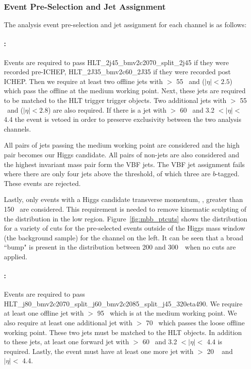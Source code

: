 \subsubsection{Event Pre-Selection and Jet Assignment}
\label{sec:vbf-presel}
The analysis event pre-selection and jet assignment for each channel is as follows:

\paragraph{\fourcentral:} Events are required to pass  HLT\_2j45\_bmv2c2070\_split\_2j45 if they were recorded pre-ICHEP, HLT\_2J35\_bmv2c60\_2J35 if they were recorded post ICHEP.  Then we require at least two offline jets with \pT $>$ 55 \GeV~and ($|\eta| < 2.5$) which pass the offline \btagging at the medium working point.  Next, these jets are required to be matched to the HLT trigger \btagged trigger objects.  Two additional jets with \pT $>$ 55 \GeV~and  ($|\eta| < 2.8$) are also required.  If there is a jet with \pT $>$ 60 \GeV~and 3.2 $< |\eta| <$ 4.4 the event is vetoed in order to preserve exclusivity between the two analysis channels.  

All pairs of \btagged jets passing the medium working point are considered and the high \pT pair becomes our Higgs candidate.  All pairs of non-\btagged jets are also considered and the highest invariant mass pair form the VBF jets.   
The VBF jet assignment fails where there are only four jets above the \pT threshold, of which three are $b$-tagged.
These events are rejected. 

Lastly, only events with a Higgs candidate transverse momentum, \pTbb, %
greater than 150 \GeV~are considered.  This requirement is needed to remove kinematic sculpting of the \Mbb distribution in the low \Mbb region.  Figure~\ref{fig:mbb_ptcuts} shows the \Mbb distribution for a variety of \pTbb cuts for the  pre-selected events outside of the Higgs mass window (the background sample) for the \fourcentral channel on the left.  It can be seen that a broad ``bump" is present in the distribution between 200 and 300~\GeV~when no \pTbb cuts are applied.  

\paragraph{\twocentral:} Events are required to pass HLT\_j80\_bmv2c2070\_split\_j60\_bmv2c2085\_split\_j45\_320eta490.   We require at least one offline jet with \pT $>$ 95 \GeV~which is \btagged at the medium working point.  We also require at least one additional jet with \pT $>$ 70 \GeV~which passes the loose offline \btagging working point.  These two jets must be matched to the HLT \btagged objects.  In addition to these jets, at least one forward jet with \pT $>$ 60 \GeV~and 3.2 $< |\eta| <$ 4.4 is required.  Lastly, the event must have at least one more jet with \pT $>$ 20 \GeV~ and $|\eta| <$ 4.4.  

